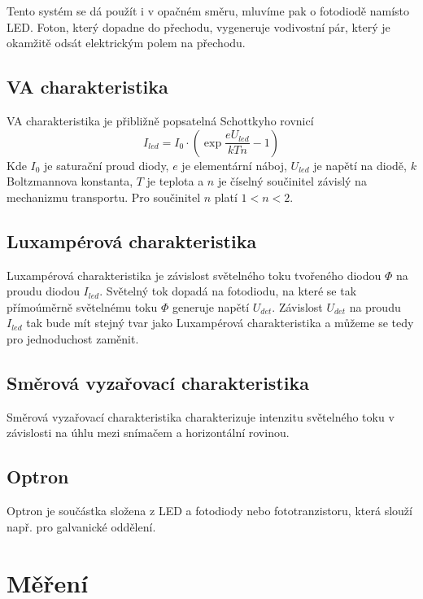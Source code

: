 \documentclass{article}
\begin{document}
Tento systém se dá použít i v opačném směru, mluvíme pak o fotodiodě namísto LED.
Foton, který dopadne do přechodu, vygeneruje vodivostní pár, který je okamžitě odsát elektrickým polem na přechodu.

\subsection{VA charakteristika}
VA charakteristika je přibližně popsatelná Schottkyho rovnicí 
\begin{equation}
    I_{led}=I_0\cdot(\exp{\frac{eU_{led}}{kTn}}-1)
    \label{schottkyho_rovnice}
\end{equation}
Kde \(I_0\) je saturační proud diody, \(e\) je elementární náboj, \(U_{led}\) je napětí na diodě, \(k\) Boltzmannova konstanta, \(T\) je teplota a \(n\) je číselný součinitel závislý na mechanizmu transportu.
Pro součinitel \(n\) platí \(1 < n < 2\).

\subsection{Luxampérová charakteristika}
Luxampérová charakteristika je závislost světelného toku tvořeného diodou \(\Phi\) na proudu diodou \(I_{led}\).
Světelný tok dopadá na fotodiodu, na které se tak přímoúměrně světelnému toku \(\Phi\) generuje napětí \(U_{det}\).
Závislost \(U_{det}\) na proudu \(I_{led}\) tak bude mít stejný tvar jako Luxampérová charakteristika a můžeme se tedy pro jednoduchost zaměnit.

\subsection{Směrová vyzařovací charakteristika}
Směrová vyzařovací charakteristika charakterizuje intenzitu světelného toku v závislosti na úhlu mezi snímačem a horizontální rovinou.

\subsection{Optron}
Optron je součástka složena z LED a fotodiody nebo fototranzistoru, která slouží např. pro galvanické oddělení. 

\section{Měření}
\end{document}
